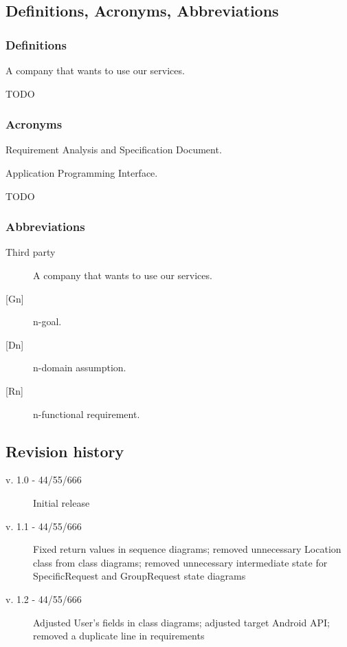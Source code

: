 \subsection{Definitions, Acronyms, Abbreviations}
\subsubsection{Definitions}
\begin{description}
    \item [Third party company] A company that wants to use our services.
    {\todo
        \item \huge TODO
    }
\end{description}
\subsubsection{Acronyms}
\begin{description}
    \item [RASD] Requirement Analysis and Specification Document. 
    \item [API] Application Programming Interface.
    {\todo
        \item \huge TODO
    }
\end{description}
\subsubsection{Abbreviations}
\begin{description}
    \item [Third party] A company that wants to use our services.
    \item [{[Gn]}] n-goal. 
    \item [{[Dn]}] n-domain assumption. 
    \item [{[Rn]}] n-functional requirement. 
\end{description}

\subsection{Revision history}
{
\todo
\begin{description}
    \item[v. 1.0 - 44/55/666] Initial release
	\item[v. 1.1 - 44/55/666] Fixed return values in sequence diagrams; removed unnecessary Location class from class diagrams; removed unnecessary intermediate state for SpecificRequest and GroupRequest state diagrams
	\item[v. 1.2 - 44/55/666] Adjusted User's fields in class diagrams; adjusted target Android API; removed a duplicate line in requirements
\end{description}
}
